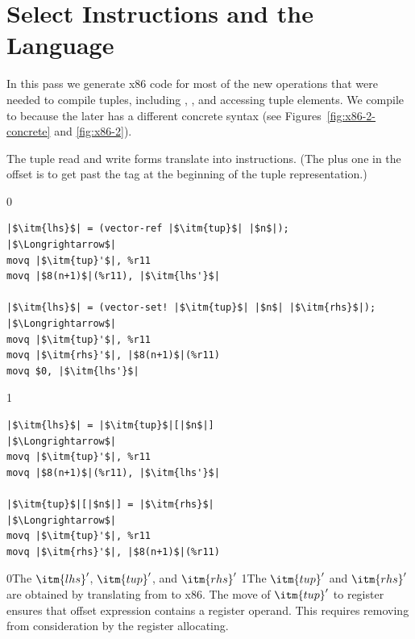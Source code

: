 \documentclass[7x10,nocrop]{TimesAPriori_MIT}%
\def\racketEd{0}
\def\pythonEd{1}
\def\edition{1}
\newcommand{\racket}[1]{{\if\edition\racketEd{#1}\fi}}
\newcommand{\python}[1]{{\if\edition\pythonEd #1\fi}}
\begin{document}
\section{Select Instructions and the \LangXGlobal{} Language}
\label{sec:select-instructions-gc}


In this pass we generate x86 code for most of the new operations that
were needed to compile tuples, including ,
, and accessing tuple elements.
%
We compile  to  because the later has a
different concrete syntax (see Figures~\ref{fig:x86-2-concrete} and
\ref{fig:x86-2}).  

The tuple read and write forms translate into 
instructions.  (The plus one in the offset is to get past the tag at
the beginning of the tuple representation.)
%
\begin{center}
\begin{minipage}{\textwidth}
{\if\edition\racketEd    
\begin{lstlisting}
|$\itm{lhs}$| = (vector-ref |$\itm{tup}$| |$n$|);
|$\Longrightarrow$|
movq |$\itm{tup}'$|, %r11
movq |$8(n+1)$|(%r11), |$\itm{lhs'}$|

|$\itm{lhs}$| = (vector-set! |$\itm{tup}$| |$n$| |$\itm{rhs}$|);
|$\Longrightarrow$|
movq |$\itm{tup}'$|, %r11
movq |$\itm{rhs}'$|, |$8(n+1)$|(%r11)
movq $0, |$\itm{lhs'}$|
\end{lstlisting}
\fi}
{\if\edition\pythonEd    
\begin{lstlisting}
|$\itm{lhs}$| = |$\itm{tup}$|[|$n$|]
|$\Longrightarrow$|
movq |$\itm{tup}'$|, %r11
movq |$8(n+1)$|(%r11), |$\itm{lhs'}$|

|$\itm{tup}$|[|$n$|] = |$\itm{rhs}$|
|$\Longrightarrow$|
movq |$\itm{tup}'$|, %r11
movq |$\itm{rhs}'$|, |$8(n+1)$|(%r11)
\end{lstlisting}
\fi}
\end{minipage}
\end{center}
\racket{The $\itm{lhs}'$, $\itm{tup}'$, and $\itm{rhs}'$}
\python{The $\itm{tup}'$ and $\itm{rhs}'$}
are obtained by translating from \LangCVec{} to x86.
%
The move of $\itm{tup}'$ to
register  ensures that offset expression
 contains a register operand.  This requires
removing  from consideration by the register allocating.
\end{document}
